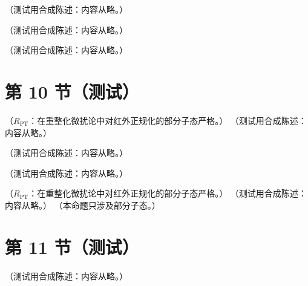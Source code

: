 \begin{definition}\label{def:qcd-lambda}
（测试用合成陈述：内容从略。）
\end{definition}

\begin{remark}[重夸克退耦与有效味数]\label{rem:qcd-decoupling}
（测试用合成陈述：内容从略。）
\end{remark}

\begin{example}\label{ex:qcd-running-numbers}
（测试用合成陈述：内容从略。）
\end{example}

\section{第 10 节（测试）}\label{sec:qcd-af}

\begin{theorem}\label{thm:qcd-asymptotic-freedom}
（$R_{\mathrm{PT}}$：在重整化微扰论中对红外正规化的部分子态严格。）
（测试用合成陈述：内容从略。）
\end{theorem}

\begin{remark}[屏蔽与反屏蔽的直观图像]\label{rem:qcd-antiscreening}
（测试用合成陈述：内容从略。）
\end{remark}

\begin{remark}\label{rem:qcd-af-meaning}
（测试用合成陈述：内容从略。）
\end{remark}

\begin{proposition}\label{prop:qcd-soft-collinear-limits}
（$R_{\mathrm{PT}}$：在重整化微扰论中对红外正规化的部分子态严格。）
（测试用合成陈述：内容从略。）
（本命题只涉及部分子态。）
\end{proposition}

\section{第 11 节（测试）}\label{sec:qcd-ir}

\begin{definition}\label{def:qcd-ir-safety-informal}
（测试用合成陈述：内容从略。）
\end{definition}


